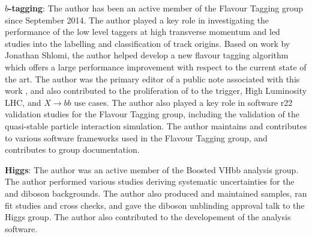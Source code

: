\textbf{$b$-tagging}:
The author has been an active member of the Flavour Tagging group since September 2014. 
The author played a key role in investigating the performance of the low level taggers at high transverse momentum and led studies into the labelling and classification of track origins.
Based on work by Jonathan Shlomi, the author helped develop a new flavour tagging algorithm which offers a large performance improvement with respect to the current state of the art.
The author was the primary editor of a public note associated with this work \cite{ATL-PHYS-PUB-2022-027}, and also contributed to the proliferation of \GNN to the trigger, High Luminosity LHC, and $X \rightarrow bb$ use cases.
The author also played a key role in software r22 validation studies for the Flavour Tagging group, including the validation of the quasi-stable particle interaction simulation.
The author maintains and contributes to various software frameworks used in the Flavour Tagging group, and contributes to group documentation.

\textbf{Higgs}:
The author was an active member of the Boosted VHbb analysis group.
The author performed various studies deriving systematic uncertainties for the \Vjets and diboson backgrounds.
The author also produced and maintained samples, ran fit studies and cross checks, and gave the diboson unblinding approval talk to the Higgs group.
The author also contributed to the developement of the analysis software.
